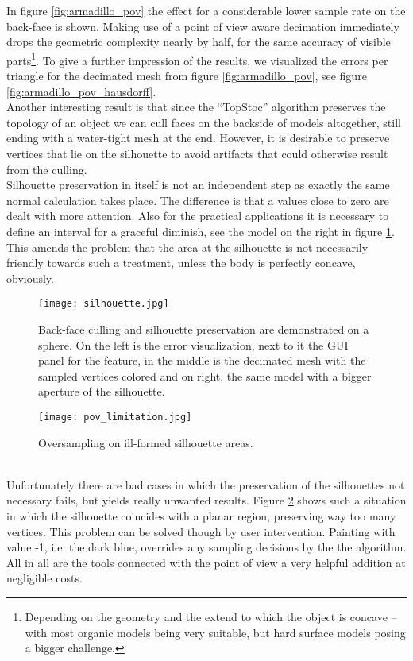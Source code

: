 In figure \ref{fig:armadillo_pov} the effect for a considerable lower sample rate on the back-face is shown.
Making use of a point of view aware decimation immediately drops the geometric complexity nearly by half, for the same accuracy of visible parts\footnote{ Depending on the geometry and the extend to which the object is concave -- with most organic models being very suitable, but hard surface models posing a bigger challenge.}.
To give a further impression of the results, we visualized the errors per triangle for the decimated mesh from figure \ref{fig:armadillo_pov}, see figure \ref{fig:armadillo_pov_hausdorff}.\\
Another interesting result is that since the ``TopStoc'' algorithm preserves the topology of an object we can cull faces on the backside of models altogether, still ending with a water-tight mesh at the end.
However, it is desirable to preserve vertices that lie on the silhouette to avoid artifacts that could otherwise result from the culling.\\
Silhouette preservation in itself is not an independent step as exactly the same normal calculation takes place.
The difference is that a values close to zero are dealt with more attention. 
Also for the practical applications it is necessary to define an interval for a graceful diminish, see the model on the right in figure \ref{fig:silhouette}.
This amends the problem that the area at the silhouette is not necessarily friendly towards such a treatment, unless the body is perfectly concave, obviously. 
\begin{figure}[ht]
\centering
\texttt{[image: silhouette.jpg]}
\caption{Back-face culling and silhouette preservation are demonstrated on a sphere. On the left is the error visualization, next to it the GUI panel for the feature, in the middle is the decimated mesh with the sampled vertices colored and on right, the same model with a bigger aperture of the silhouette.}
\label{fig:silhouette}
\end{figure}
\begin{figure}[ht]
\center
\texttt{[image: pov\_limitation.jpg]}
\caption{Oversampling on ill-formed silhouette areas.}
\label{fig:pov_limitation}
\end{figure}\\
Unfortunately there are bad cases in which the preservation of the silhouettes not necessary fails, but yields really unwanted results.
Figure \ref{fig:pov_limitation} shows such a situation in which the silhouette coincides with a planar region, preserving way too many vertices.
This problem can be solved though by user intervention.
Painting with value -1, i.e. the dark blue, overrides any sampling decisions by the the algorithm.
All in all are the tools connected with the point of view a very helpful addition at negligible costs.


